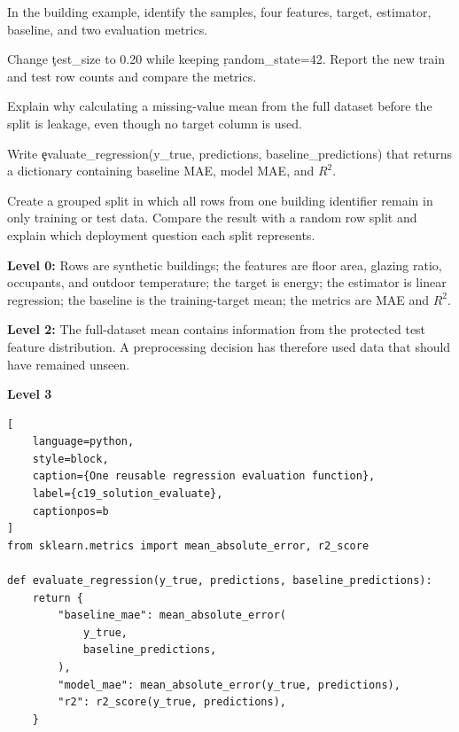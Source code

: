 

In the building example, identify the samples, four features, target, estimator,
baseline, and two evaluation metrics.


Change \c{test_size} to 0.20 while keeping \c{random_state=42}. Report the new
train and test row counts and compare the metrics.


Explain why calculating a missing-value mean from the full dataset before the
split is leakage, even though no target column is used.


Write \c{evaluate_regression(y_true, predictions, baseline_predictions)} that
returns a dictionary containing baseline MAE, model MAE, and $R^2$.


Create a grouped split in which all rows from one building identifier remain in
only training or test data. Compare the result with a random row split and
explain which deployment question each split represents.


\textbf{Level 0:} Rows are synthetic buildings; the features are floor area,
glazing ratio, occupants, and outdoor temperature; the target is energy; the
estimator is linear regression; the baseline is the training-target mean; the
metrics are MAE and $R^2$.

\textbf{Level 2:} The full-dataset mean contains information from the protected
test feature distribution. A preprocessing decision has therefore used data
that should have remained unseen.

\textbf{Level 3}

\begin{lstlisting}[
    language=python,
    style=block,
    caption={One reusable regression evaluation function},
    label={c19_solution_evaluate},
    captionpos=b
]
from sklearn.metrics import mean_absolute_error, r2_score

def evaluate_regression(y_true, predictions, baseline_predictions):
    return {
        "baseline_mae": mean_absolute_error(
            y_true,
            baseline_predictions,
        ),
        "model_mae": mean_absolute_error(y_true, predictions),
        "r2": r2_score(y_true, predictions),
    }
\end{lstlisting}

